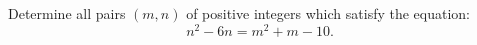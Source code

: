 Determine all pairs $(m, n)$ of positive integers which satisfy the equation: 
$$n^2 - 6n = m^2 + m - 10.$$